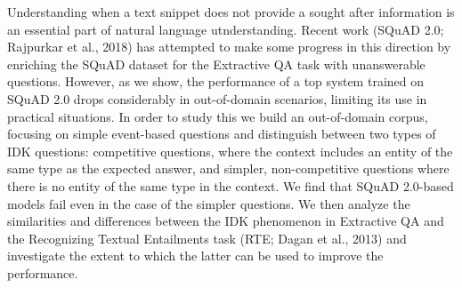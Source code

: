 Understanding when a text snippet does not provide a sought after information is an essential part of natural language utnderstanding. Recent work (SQuAD 2.0; Rajpurkar et al., 2018) has attempted to make some progress in this direction by enriching the SQuAD dataset for the Extractive QA task with unanswerable questions. However, as we show, the performance of a top system trained on SQuAD 2.0 drops considerably in out-of-domain scenarios, limiting its use in practical situations. In order to study this we build an out-of-domain corpus, focusing on simple event-based questions and distinguish between two types of IDK questions: competitive questions, where the context includes an entity of the same type as the expected answer, and simpler, non-competitive questions where there is no entity of the same type in the context. We find that SQuAD 2.0-based models fail even in the case of the simpler questions. We then analyze the similarities and differences between the IDK phenomenon in Extractive QA and the Recognizing Textual Entailments task (RTE; Dagan et al., 2013) and investigate the extent to which the latter can be used to improve the performance.
